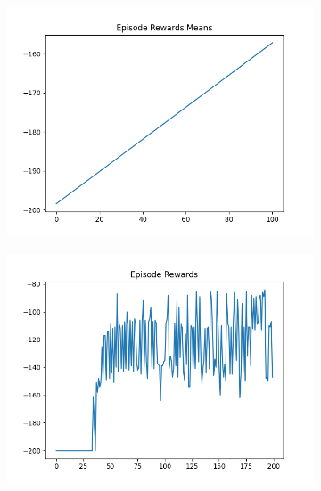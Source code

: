 \begin{figure}[H]
\begin{subfigure}{.47\linewidth}
        \includegraphics[width=\textwidth]{mountain/2024-06-15_16-46-16_dqn_mountaincar_episode_rewards_means.png}
    \end{subfigure}
    \begin{subfigure}{.47\linewidth}
        \centering
        \includegraphics[width=\textwidth]{mountain/2024-06-15_13-36-42_dqn_mountaincar_episode_rewards.png}
    \end{subfigure}
\end{figure}
